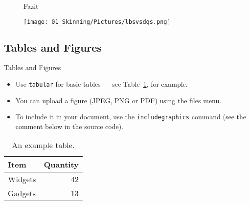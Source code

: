 						\begin{frame}{
								\begin{figure}
									\colorbox{black!10}{\Huge{Fazit}}
								\end{figure}
							}
							
							\begin{figure}
								\texttt{[image: 01\_Skinning/Pictures/lbsvsdqs.png]}
							\end{figure}
							
							
							
						\end{frame}
		
		



	
	
	\subsection{Tables and Figures}
	
	\begin{frame}{Tables and Figures}
		
		\begin{itemize}
			\item Use \texttt{tabular} for basic tables --- see Table~\ref{tab:widgets}, for example.
			\item You can upload a figure (JPEG, PNG or PDF) using the files menu. 
			\item To include it in your document, use the \texttt{includegraphics} command (see the comment below in the source code).
		\end{itemize}
		
		
		\begin{table}
			\centering
			\begin{tabular}{l|r}
				Item & Quantity \\\hline
				Widgets & 42 \\
				Gadgets & 13
			\end{tabular}
			\caption{\label{tab:widgets}An example table.}
		\end{table}
		
	\end{frame}
	
